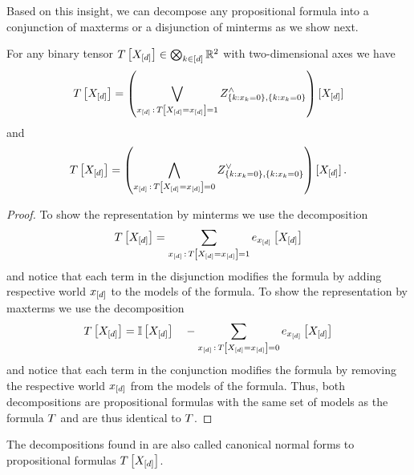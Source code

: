 Based on this insight, we can decompose any propositional formula into a conjunction of maxterms or a disjunction of minterms as we show next.

\begin{theorem}\label{the:tensorToMaxMinTerms}
	For any binary tensor $T\left[X_{[d]}\right]\in\bigotimes_{k\in[d]}\mathbb{R}^2$ with two-dimensional axes we have
	\begin{align*}
		T\left[X_{[d]}\right] = \left( \bigvee_{x_{[d]} \, : \, T\left[X_{[d]}=x_{[d]}\right] = 1} 
		Z^{\land}_{\{k : x_{k}=0\},\{k : x_{k}=0\}} 
		\right)
		[X_{[d]}] 
	\end{align*}
	and
	\begin{align*}
		T\left[X_{[d]}\right] = \left( \bigwedge_{x_{[d]} \, : \, T\left[X_{[d]}=x_{[d]}\right] = 0} 
		Z^{\lor}_{\{k : x_{k}=0\},\{k : x_{k}=0\}} 
		\right)
		[X_{[d]}] \, .
	\end{align*}
\end{theorem}
\begin{proof}
	To show the representation by minterms we use the decomposition
	\begin{align*}
		T\left[X_{[d]}\right]  = \sum_{x_{[d]} \, : \, T\left[X_{[d]}=x_{[d]}\right] = 1} e_{x_{[d]}}\left[X_{[d]}\right]
	\end{align*}
	and notice that each term in the disjunction modifies the formula by adding respective world $x_{[d]}$ to the models of the formula.
	To show the representation by maxterms we use the decomposition
	\begin{align*}
		T\left[X_{[d]}\right]  = \mathbb{I}\left[X_{[d]}\right] \quad - \sum_{x_{[d]} \, : \, T\left[X_{[d]}=x_{[d]}\right] = 0} e_{x_{[d]}}\left[X_{[d]}\right]
	\end{align*}
	and notice that each term in the conjunction modifies the formula by removing the respective world $x_{[d]}$ from the models of the formula.	
	Thus, both decompositions are propositional formulas with the same set of models as the formula $T$ and are thus identical to $T$.
\end{proof}


The decompositions found in  are also called canonical normal forms to propositional formulas $T\left[X_{[d]}\right]$.

